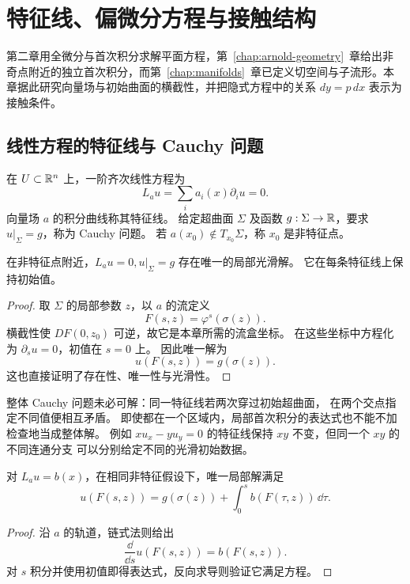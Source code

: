 \chapter{特征线、偏微分方程与接触结构}\label{chap:characteristics}

第二章用全微分与首次积分求解平面方程，第~\ref{chap:arnold-geometry}~章给出非奇点附近的独立首次积分，而第~\ref{chap:manifolds}~章已定义切空间与子流形。本章据此研究向量场与初始曲面的横截性，并把隐式方程中的关系 $dy=p\,dx$ 表示为接触条件。

\section{线性方程的特征线与 Cauchy 问题}
\begin{definition}
在 $U\subset\mathbb{R}^n$ 上，一阶齐次线性方程为
\[
 L_a u=\sum_i a_i(x)\partial_i u=0.
\]
向量场 $a$ 的积分曲线称其特征线。
给定超曲面 $\Sigma$ 及函数 $g:\Sigma\to\mathbb{R}$，要求 $u|_\Sigma=g$，称为 Cauchy 问题。
若 $a(x_0)\notin T_{x_0}\Sigma$，称 $x_0$ 是非特征点。
\end{definition}
\begin{theorem}
在非特征点附近，$L_au=0,u|_\Sigma=g$ 存在唯一的局部光滑解。
它在每条特征线上保持初始值。
\end{theorem}
\begin{proof}
取 $\Sigma$ 的局部参数 $z$，以 $a$ 的流定义
\[
 F(s,z)=\varphi^s(\sigma(z)).
\]
横截性使 $DF(0,z_0)$ 可逆，故它是本章所需的流盒坐标。
在这些坐标中方程化为 $\partial_su=0$，初值在 $s=0$ 上。
因此唯一解为 
\[
 u(F(s,z))=g(\sigma(z)).
\]
这也直接证明了存在性、唯一性与光滑性。
\end{proof}
整体 Cauchy 问题未必可解：同一特征线若两次穿过初始超曲面，
在两个交点指定不同值便相互矛盾。
即使都在一个区域内，局部首次积分的表达式也不能不加检查地当成整体解。
例如 $xu_x-yu_y=0$ 的特征线保持 $xy$ 不变，但同一个 $xy$ 的不同连通分支
可以分别给定不同的光滑初始数据。

\begin{theorem}[非齐次特征线积分]
对 $L_au=b(x)$，在相同非特征假设下，唯一局部解满足
\[
 u(F(s,z))=g(\sigma(z))+\int_0^sb(F(\tau,z))\,\dd\tau.
\]
\end{theorem}
\begin{proof}
沿 $a$ 的轨道，链式法则给出 
\[
 \frac{\dd}{\dd s}u(F(s,z))=b(F(s,z)).
\]
对 $s$ 积分并使用初值即得表达式，反向求导则验证它满足方程。
\end{proof}

